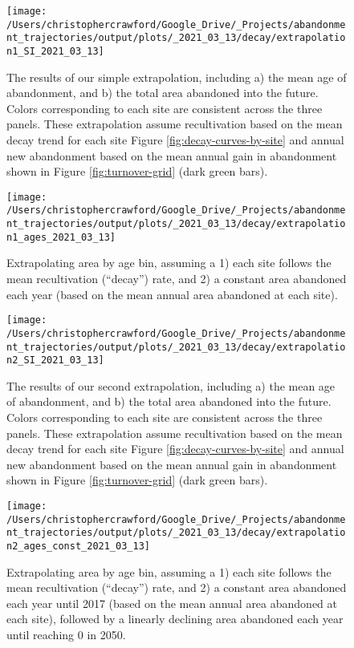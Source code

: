 \documentclass[9pt,twoside,lineno]{pnas-new}
\begin{document}
\begin{figure}
\texttt{[image: /Users/christophercrawford/Google\_Drive/\_Projects/abandonment\_trajectories/output/plots/\_2021\_03\_13/decay/extrapolation1\_SI\_2021\_03\_13]} \caption{The results of our simple extrapolation, including a) the mean age of abandonment, and b) the total area abandoned into the future. Colors corresponding to each site are consistent across the three panels. These extrapolation assume recultivation based on the mean decay trend for each site Figure \ref{fig:decay-curves-by-site} and annual new abandonment based on the mean annual gain in abandonment shown in Figure \ref{fig:turnover-grid} (dark green bars).}\label{fig:extrapolation-combo}
\end{figure}



\begin{figure}
\texttt{[image: /Users/christophercrawford/Google\_Drive/\_Projects/abandonment\_trajectories/output/plots/\_2021\_03\_13/decay/extrapolation1\_ages\_2021\_03\_13]} \caption{Extrapolating area by age bin, assuming a 1) each site follows the mean recultivation (``decay'') rate, and 2) a constant area abandoned each year (based on the mean annual area abandoned at each site).}\label{fig:extrapolation-area-by-age}
\end{figure}



\begin{figure}
\texttt{[image: /Users/christophercrawford/Google\_Drive/\_Projects/abandonment\_trajectories/output/plots/\_2021\_03\_13/decay/extrapolation2\_SI\_2021\_03\_13]} \caption{The results of our second extrapolation, including a) the mean age of abandonment, and b) the total area abandoned into the future. Colors corresponding to each site are consistent across the three panels. These extrapolation assume recultivation based on the mean decay trend for each site Figure \ref{fig:decay-curves-by-site} and annual new abandonment based on the mean annual gain in abandonment shown in Figure \ref{fig:turnover-grid} (dark green bars).}\label{fig:extrapolation2-combo}
\end{figure}



\begin{figure}
\texttt{[image: /Users/christophercrawford/Google\_Drive/\_Projects/abandonment\_trajectories/output/plots/\_2021\_03\_13/decay/extrapolation2\_ages\_const\_2021\_03\_13]} \caption{Extrapolating area by age bin, assuming a 1) each site follows the mean recultivation (``decay'') rate, and 2) a constant area abandoned each year until 2017 (based on the mean annual area abandoned at each site), followed by a linearly declining area abandoned each year until reaching 0 in 2050.}\label{fig:extrapolation2-area-by-age}
\end{figure}
\end{document}
